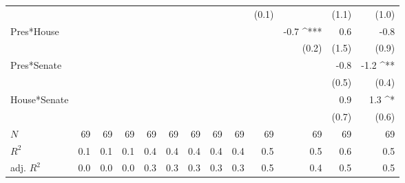 \documentclass[a4paper]{article}\usepackage{graphicx, color}
\begin{document}
\begin{table}[ht]
\begin{center}
{\begin{tabular}{ l D{.}{.}{1}D{.}{.}{1}D{.}{.}{1}D{.}{.}{1}D{.}{.}{1}D{.}{.}{1}D{.}{.}{1}D{.}{.}{1}D{.}{.}{1}D{.}{.}{1}D{.}{.}{1}D{.}{.}{1} }
                     &                 &                 &                 &                 &                 &                 &                 &                 & (0.1)           &                 & (1.1)           & (1.0)          \\ 
Pres*House           &                 &                 &                 &                 &                 &                 &                 &                 &                 & -0.7 ^{***}     & 0.6             & -0.8           \\ 
                     &                 &                 &                 &                 &                 &                 &                 &                 &                 & (0.2)           & (1.5)           & (0.9)          \\ 
Pres*Senate          &                 &                 &                 &                 &                 &                 &                 &                 &                 &                 & -0.8            & -1.2 ^{**}     \\ 
                     &                 &                 &                 &                 &                 &                 &                 &                 &                 &                 & (0.5)           & (0.4)          \\ 
House*Senate         &                 &                 &                 &                 &                 &                 &                 &                 &                 &                 & 0.9             & 1.3 ^*         \\ 
                     &                 &                 &                 &                 &                 &                 &                 &                 &                 &                 & (0.7)           & (0.6)           \\
 $N$                  & 69              & 69              & 69              & 69              & 69              & 69              & 69              & 69              & 69              & 69              & 69              & 69             \\ 
$R^2$                & 0.1             & 0.1             & 0.1             & 0.4             & 0.4             & 0.4             & 0.4             & 0.4             & 0.5             & 0.5             & 0.6             & 0.5            \\ 
adj. $R^2$           & 0.0             & 0.0             & 0.0             & 0.3             & 0.3             & 0.3             & 0.3             & 0.3             & 0.5             & 0.4             & 0.5             & 0.5            \\ 

\end{tabular}}
\end{center}
\end{table}
\end{document}
